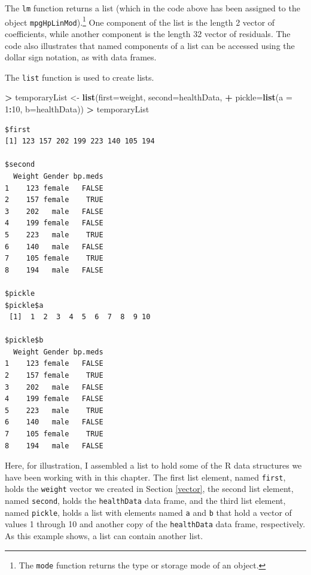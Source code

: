 \documentclass[]{krantz}
\makeatletter
\newenvironment{Shaded}{\begin{snugshade}}{\end{snugshade}}
\newcommand{\DataTypeTok}[1]{\textcolor[rgb]{0.27,0.27,0.27}{#1}}
\newcommand{\DecValTok}[1]{\textcolor[rgb]{0.06,0.06,0.06}{#1}}
\newcommand{\KeywordTok}[1]{\textcolor[rgb]{0.27,0.27,0.27}{\textbf{#1}}}
\newcommand{\NormalTok}[1]{#1}
\newcommand{\OperatorTok}[1]{\textcolor[rgb]{0.43,0.43,0.43}{\textbf{#1}}}
\newcommand{\StringTok}[1]{\textcolor[rgb]{0.5,0.5,0.5}{#1}}
\newenvironment{kframe}{%
\medskip{}
\setlength{\fboxsep}{.8em}
 \def\at@end@of@kframe{}%
 \ifinner\ifhmode%
  \def\at@end@of@kframe{\end{minipage}}%
  \begin{minipage}{\columnwidth}%
 \fi\fi%
 \def\FrameCommand##1{\hskip\@totalleftmargin \hskip-\fboxsep
 \colorbox{shadecolor}{##1}\hskip-\fboxsep
     \hskip-\linewidth \hskip-\@totalleftmargin \hskip\columnwidth}%
 \MakeFramed {\advance\hsize-\width
   \@totalleftmargin\z@ \linewidth\hsize
   \@setminipage}}%
 {\par\unskip\endMakeFramed%
 \at@end@of@kframe}
\renewenvironment{Shaded}{\begin{kframe}}{\end{kframe}}
\makeatother
\begin{document}
The \texttt{lm} function returns a list (which in the code above has been assigned to the object \texttt{mpgHpLinMod}).\footnote{The \texttt{mode} function returns the type or storage mode of an object.} One component of the list is the length 2 vector of coefficients, while another component is the length 32 vector of residuals. The code also illustrates that named components of a list can be accessed using the dollar sign notation, as with data frames.

The \texttt{list} function is used to create lists.

\begin{Shaded}
\begin{Highlighting}[]
\OperatorTok{>}\StringTok{ }\NormalTok{temporaryList <-}\StringTok{ }\KeywordTok{list}\NormalTok{(}\DataTypeTok{first=}\NormalTok{weight, }\DataTypeTok{second=}\NormalTok{healthData,}
\OperatorTok{+}\StringTok{                       }\DataTypeTok{pickle=}\KeywordTok{list}\NormalTok{(}\DataTypeTok{a =} \DecValTok{1}\OperatorTok{:}\DecValTok{10}\NormalTok{, }\DataTypeTok{b=}\NormalTok{healthData))}
\OperatorTok{>}\StringTok{ }\NormalTok{temporaryList}
\end{Highlighting}
\end{Shaded}

\begin{verbatim}
$first
[1] 123 157 202 199 223 140 105 194

$second
  Weight Gender bp.meds
1    123 female   FALSE
2    157 female    TRUE
3    202   male   FALSE
4    199 female   FALSE
5    223   male    TRUE
6    140   male   FALSE
7    105 female    TRUE
8    194   male   FALSE

$pickle
$pickle$a
 [1]  1  2  3  4  5  6  7  8  9 10

$pickle$b
  Weight Gender bp.meds
1    123 female   FALSE
2    157 female    TRUE
3    202   male   FALSE
4    199 female   FALSE
5    223   male    TRUE
6    140   male   FALSE
7    105 female    TRUE
8    194   male   FALSE
\end{verbatim}

Here, for illustration, I assembled a list to hold some of the R data structures we have been working with in this chapter. The first list element, named \texttt{first}, holds the \texttt{weight} vector we created in Section \ref{vector}, the second list element, named \texttt{second}, holds the \texttt{healthData} data frame, and the third list element, named \texttt{pickle}, holds a list with elements named \texttt{a} and \texttt{b} that hold a vector of values 1 through 10 and another copy of the \texttt{healthData} data frame, respectively. As this example shows, a list can contain another list.
\end{document}
